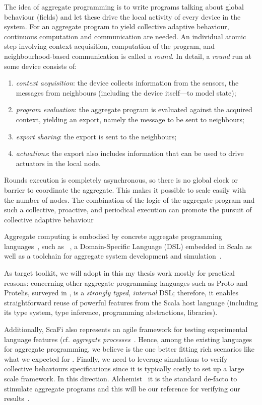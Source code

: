 \documentclass[11pt]{article}
\begin{document}
The idea of aggregate programming is to write programs talking about global behaviour (fields) and let these drive the local activity of every device in the system.
%
For an aggregate program to yield collective adaptive behaviour, continuous computation and communication are needed.
%
An individual atomic step involving context acquisition, computation of the program, and neighbourhood-based communication is called a \emph{round}.
%
In detail, a \emph{round} run at some device consists of:
\begin{enumerate}
  \item \emph{context acquisition}: the device collects information from the sensors, the messages from neighbours (including the device itself---to model state);
  \item \emph{program evaluation}: the aggregate program is evaluated against the acquired context, yielding an export, namely the message to be sent to neighbours;
  \item \emph{export sharing}: the export is sent to the neighbours;
  \item \emph{actuations}: the export also includes information that can be used to drive actuators in the local node.
\end{enumerate}

Rounds execution is completely asynchronous, so there is no global clock or barrier to coordinate the aggregate. This makes it possible to scale easily with the number of nodes. 
%
The combination of the logic of the aggregate program and such a collective, proactive, and periodical execution can promote the pursuit of collective adaptive behaviour

Aggregate computing is embodied by concrete aggregate programming languages~\cite{viroli2019jlamp-si-coord},
 such as \scafi{}~\cite{DBLP:conf/isola/CasadeiVAD20,DBLP:journals/eaai/CasadeiVAPD21},
 a Domain-Specific Language (DSL) embedded in Scala
 as well as a toolchain for aggregate system development and simulation~\cite{Casadei2016mass}.
%

As target toolkit, we will adopt \scafi{} in this my thesis work mostly for practical reasons: concerning other aggregate programming languages such as Proto and Protelis, surveyed in \cite{viroli2019jlamp-si-coord},
\scafi{} is a \emph{strongly typed}, \emph{internal} DSL; therefore, it enables straightforward reuse of powerful features from the Scala host language (including its type system, type inference, programming abstractions, libraries).

Additionally, ScaFi also represents an agile framework for testing experimental language features (cf. \emph{aggregate processes}~\cite{DBLP:journals/eaai/CasadeiVAPD21}.
%
Hence, among the existing languages for aggregate programming, we believe \scafi{} is the one better fitting rich scenarios like what we expected for \cpsw{}.
%
Finally, we need to leverage simulations to verify collective behaviours specifications since it is typically costly to set up a large scale framework. In this direction. Alchemist~\cite{} it is the standard de-facto to stimulate aggregate programs and this will be our reference for verifying our results~\cite{Pianini_2013}.
\end{document}
